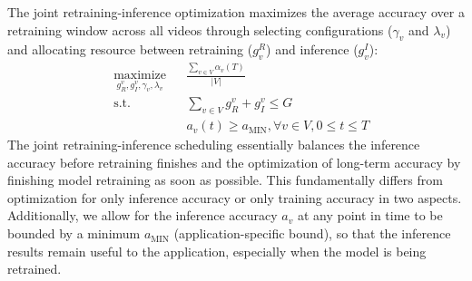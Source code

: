 
\noindent The joint retraining-inference optimization maximizes the average accuracy over a retraining window across all videos through selecting configurations ($\gamma_v$ and $\lambda_v$) and allocating resource between retraining ($g^{R}_v$) and inference ($g^{I}_v$):
\begin{equation}
    \begin{aligned}
        & \underset{g_{R}^v, g_{I}^v, \gamma_v, \lambda_v}{\text{maximize}}
        & & \frac{\sum_{v \in V}\alpha_v(T)}{|V|} \\
        & \text{s.t.}
        & & \sum_{v \in V} g_{R}^v + g_{I}^v \leq G\\
        &&& a_v(t) \geq a_\text{MIN}, \forall v \in V, 0 \leq t \leq T 
    \end{aligned}
    \label{eqn:optimization}
\end{equation}
The joint retraining-inference scheduling essentially balances the inference accuracy before retraining finishes and the optimization of long-term accuracy by finishing model retraining as soon as possible.
This fundamentally differs from optimization for only inference accuracy or only training accuracy in two aspects.
Additionally, we allow for the inference accuracy $a_v$ at any point in time to be bounded by a minimum $a_\text{MIN}$ (application-specific bound), so that the inference results remain useful to the application, especially when the model is being retrained.


